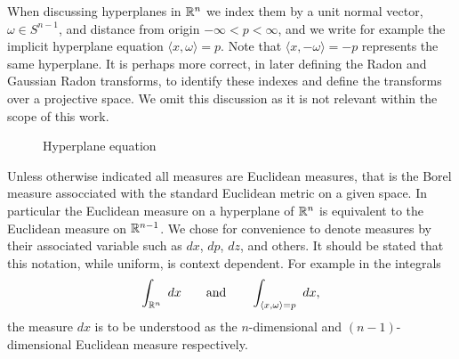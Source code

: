 \begin{notationpage}
When discussing hyperplanes in $\mathbb{R}^n$ we index them by a unit normal vector, $\omega \in S^{n-1}$, and distance from origin $-\infty < p < \infty$, and we write for example the implicit hyperplane equation $\langle x, \omega \rangle = p$. Note that $\langle x, -\omega \rangle = -p$ represents the same hyperplane. It is perhaps more correct, in later defining the Radon and Gaussian Radon transforms, to identify these indexes and define the transforms over a projective space. We omit this discussion as it is not relevant within the scope of this work.
\begin{figure}[h]
  \centering
  \caption{Hyperplane equation}\label{fig:HypEq}
\end{figure}

Unless otherwise indicated all measures are Euclidean measures, that is the Borel measure assocciated with the standard Euclidean metric on a given space. In particular the Euclidean measure on a hyperplane of $\mathbb{R}^n$ is equivalent to the Euclidean measure on $\mathbb{R}^{n-1}$. We chose for convenience to denote measures by their associated variable such as $dx$, $dp$, $dz$, and others. It should be stated that this notation, while uniform, is context dependent. For example in the integrals
\[
  \int_{\mathbb{R}^n}~dx \qquad \text{and} \qquad \int_{\langle x, \omega\rangle = p} ~dx,
\]
the measure $dx$ is to be understood as the $n$-dimensional and $(n-1)$-dimensional Euclidean measure respectively.



\end{notationpage}
